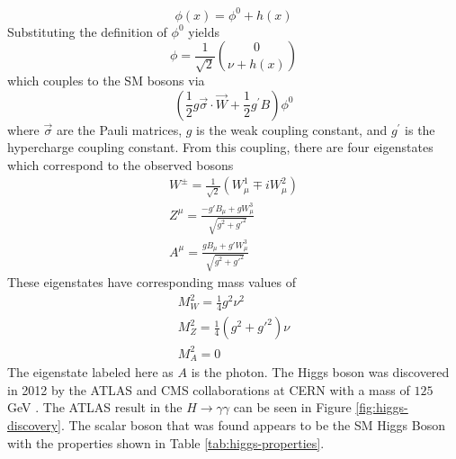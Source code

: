 		\begin{equation}\label{eqn:phi-h} \phi(x) = \phi^0 + h(x) \end{equation}
		Substituting the definition of $\phi^0$ yields
		\begin{equation}\label{eqn:phi-h-vec} \phi = \frac{1}{\sqrt{2}} \binom{0}{\nu+h(x)} \end{equation}
		which couples to the \gls{SM} bosons via
		\begin{equation}\label{eqn:coupling} (\frac{1}{2} g \vec{\sigma} \cdot \vec{W} + \frac{1}{2} g^\prime B ) \phi^0  \end{equation} where $\vec{\sigma}$ are the Pauli matrices, $g$ is the weak coupling constant, and $g^{\prime}$ is the hypercharge coupling constant. From this coupling, there are four eigenstates which correspond to the observed bosons
		\begin{equation}\label{eqn:mass-eigenstates} \begin{split}
		W^\pm = \frac{1}{\sqrt{2}} ( W^1_\mu \mp i W^2_\mu ) \\
		Z^\mu = \frac{ - g\prime B_\mu + g W^3_\mu }{ \sqrt{g^2+g\prime^2} } \\
		A^\mu = \frac{ g B_\mu + g\prime W^3_\mu }{ \sqrt{g^2+g\prime^2} }
		\end{split}
		\end{equation}
		These eigenstates have corresponding mass values of 
		\begin{equation}\label{eqn:mass-eigenstates-masses} \begin{split}
		M^2_W = \frac{1}{4}g^2\nu^2 \\
		M^2_Z = \frac{1}{4}(g^2+g\prime^2)\nu \\
		M^2_A = 0
		\end{split}
		\end{equation}
		The eigenstate labeled here as $A$ is the photon. The Higgs boson was discovered in 2012 by the \gls{ATLAS} and \gls{CMS} collaborations at \gls{CERN} with a mass of $125$ GeV \cites{higgs-discovery-atlas}{CMS-Higgs-Discovery}. The \gls{ATLAS} result in the $H \to \gamma \gamma$ can be seen in Figure \ref{fig:higgs-discovery}. The scalar boson that was found appears to be the \gls{SM} Higgs Boson with the properties shown in Table \ref{tab:higgs-properties}.

		\begin{table}[!thp]
			\centering
			\caption{The Higgs boson's properties \cite{pdg}}
			\label{tab:higgs-properties}
		\end{table}

